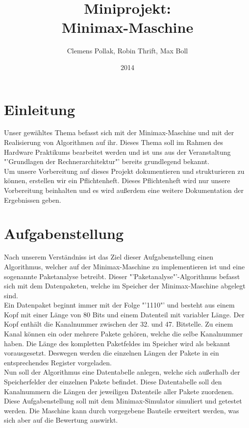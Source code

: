 \documentclass[12pt,titlepage]{article}
\begin{document}
\title{Miniprojekt: \\ Minimax-Maschine}
\author{Clemens Pollak, Robin Thrift, Max Boll}
\date{2014}
\maketitle


\section{Einleitung} 
Unser gew{\"a}hltes Thema befasst sich mit der Minimax-Maschine und mit der Realisierung von Algorithmen auf ihr. Dieses Thema soll im Rahmen des Hardware Praktikums bearbeitet werden und ist uns aus der Veranstaltung "'Grundlagen der Rechnerarchitektur"' bereits grundlegend bekannt.\\ Um unsere Vorbereitung auf dieses Projekt dokumentieren und strukturieren zu k{\"o}nnen, erstellen wir ein Pflichtenheft. Dieses Pflichtenheft wird nur unsere Vorbereitung beinhalten und es wird au{\ss}erdem eine weitere Dokumentation der Ergebnissen geben.

\section{Aufgabenstellung}
Nach unserem Verst{\"a}ndniss ist das Ziel dieser Aufgabenstellung einen Algorithmus, welcher auf der Minimax-Maschine zu implementieren ist und eine sogenannte Paketanalyse betreibt. Dieser "'Paketanalyse"'-Algorithmus befasst sich mit dem Datenpaketen, welche im Speicher der Minimax-Maschine abgelegt sind.\\ Ein Datenpaket beginnt immer mit der Folge "'1110"' und besteht aus einem
Kopf mit einer L{\"a}nge von 80 Bits und einem Datenteil mit variabler Länge. Der Kopf enth{\"a}lt die Kanalnummer zwischen der 32. und 47. Bitstelle. Zu einem Kanal können ein oder mehrere Pakete gehören, welche die selbe Kanalnummer haben.
Die Länge des kompletten Paketfeldes im Speicher wird als bekannt vorausgesetzt. Deswegen werden die einzelnen L{\"a}ngen der Pakete in ein entsprechendes Register vorgeladen.\\
Nun soll der Algorithmus eine Datentabelle anlegen, welche sich au{\ss}erhalb der Speicherfelder der einzelnen Pakete befindet. Diese Datentabelle soll den Kanalnummern die L{\"a}ngen der jeweiligen Datenteile aller Pakete zuordenen. Diese Aufgabenstellung soll mit dem Minimax-Simulator simuliert und getestet werden. Die Maschine kann durch vorgegebene Bauteile erweitert werden, was sich aber auf die Bewertung auswirkt.
\end{document}
